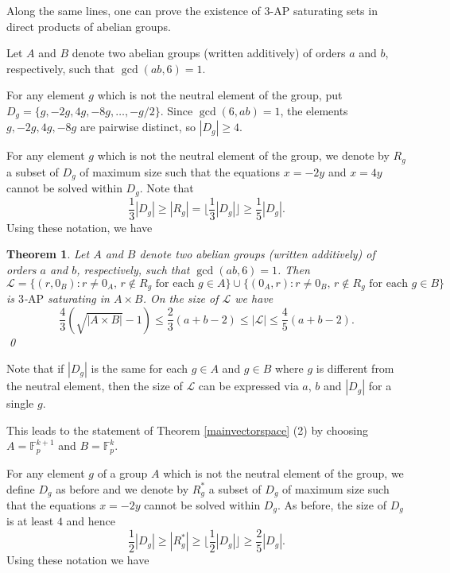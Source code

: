 \documentclass[11pt]{article}
\numberwithin{table}{section}
\newcommand{\cL}{{\mathcal L}}
\newcommand{\F}{{\mathbb F}}
\newtheorem{theorem}{Theorem}[section]
\theoremstyle{definition}
\begin{document}
	
	Along the same lines, one can prove the existence of $3$-AP saturating sets in direct products of abelian groups.
	
	Let $A$ and $B$ denote two abelian groups (written additively) of orders $a$ and $b$, respectively, such that $\gcd(ab,6)=1$.
	
	For  any element $g$ which is not the neutral element of the group, put $D_g=\{g,-2g,4g,-8g,\ldots,-g/2\}$. Since $\gcd(6,ab)=1$, the elements $g,-2g,4g,-8g$ are pairwise distinct, so $|D_g| \geq 4$.
	
	For any element $g$ which is not the neutral element of the group, we denote by $R_g$ a subset of $D_g$ of maximum size such that the equations $x=-2y$ and $x=4y$ cannot be solved within $D_g$. 
	Note that \[\frac13 |D_g| \geq |R_g|=\lfloor\frac13|D_g|\rfloor\geq \frac15 |D_g|.\] 
	Using these notation, we have 
	
	\begin{theorem}
		\label{dirprod}
		Let $A$ and $B$ denote two abelian groups (written additively) of orders $a$ and $b$, respectively, such that $\gcd(ab,6)=1$.
		Then
		\[\cL=\{(r,0_B) : r \neq 0_A,\, r\notin R_g \mbox{ for each } g \in A\} \cup \{(0_A,r) : r \neq 0_B,\, r\notin R_g \mbox{ for each } g \in B\}\]
		is $3$-$\mathrm{AP}$ saturating in $A\times B$.
		On the size of $\cL$ we have
		\[\frac43 (\sqrt{|A\times B|}-1)\leq \frac23(a+b-2) \leq |\cL|\leq \frac45(a+b-2) .\]
		\qed
	\end{theorem}
	
	Note that if $|D_g|$ is the same for each $g\in A$ and $g\in B$ where $g$ is different from the neutral element, then the size of $\cL$ can be expressed via $a$, $b$ and $|D_g|$ for a single $g$. %
	
	This leads to the statement of Theorem \ref{mainvectorspace} (2) by choosing $A=\F_{p}^{k+1}$ and $B=\F_p^k$.
	
	
	For any element $g$ of a group $A$ which is not the neutral element of the group, we define $D_g$ as before and we denote by $R^*_g$ a subset of $D_g$ of maximum size such that the equations $x=-2y$ cannot be solved within $D_g$. As before, the size of $D_g$ is at least $4$ and hence
	\[\frac12 |D_g| \geq |R^*_g| \geq \lfloor \frac12|D_g| \rfloor \geq \frac25|D_g|.\]
	Using these notation we have
	
\end{document}

